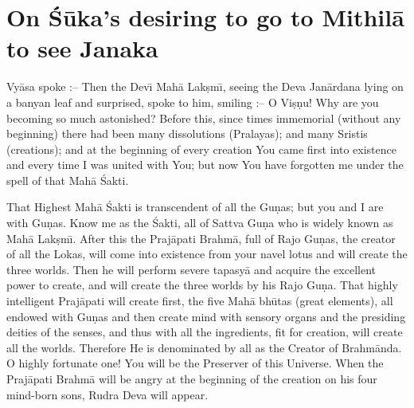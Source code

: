 \chapter{On \'S\=uka's desiring to go to Mithil\=a to see Janaka}

Vy\=asa spoke :-- Then the Dev\={\i} Mah\=a Lak\d{s}m\={\i}, seeing the Deva Jan\=ardana lying on a banyan leaf and surprised, spoke to him, smiling :-- O Vi\d{s}\d{n}u! Why are you becoming so much astonished? Before this, since times immemorial (without any beginning) there had been many dissolutions (Pralayas); and many Sristis (creations); and at the beginning of every creation You came first into existence and every time I was united with You; but now You have forgotten me under the spell of that Mah\=a \'Sakti.

That Highest Mah\=a \'Sakti is transcendent of all the Gu\d{n}as; but you and I are with Gu\d{n}as. Know me as the \'Sakti, all of Sattva Gu\d{n}a who is widely known as Mah\=a Lak\d{s}m\={\i}. After this the Praj\=apati Brahm\=a, full of Rajo Gu\d{n}as, the creator of all the Lokas, will come into existence from your navel lotus and will create the three worlds. Then he will perform severe tapasy\=a and acquire the excellent power to create, and will create the three worlds by his Rajo Gu\d{n}a. That highly intelligent Praj\=apati will create first, the five Mah\=a bh\=utas (great elements), all endowed with Gu\d{n}as and then create mind with sensory organs and the presiding deities of the senses, and thus with all the ingredients, fit for creation, will create all the worlds. Therefore He is denominated by all as the Creator of Brahm\=anda. O highly fortunate one! You will be the Preserver of this Universe. When the Praj\=apati Brahm\=a will be angry at the beginning of the creation on his four mind-born sons, Rudra Deva will appear.

